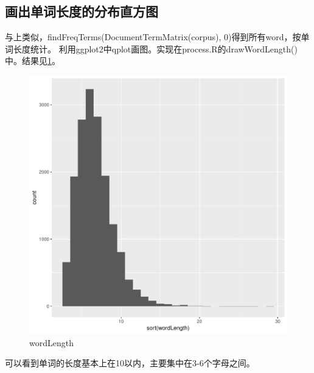 \documentclass[12pt]{article}
\begin{document}
\subsection{画出单词长度的分布直方图}
与上类似，findFreqTerms(DocumentTermMatrix(corpus), 0)得到所有word，按单词长度统计。
利用ggplot2中qplot画图。实现在process.R的drawWordLength()中。结果见\ref{fig:wordLength}。
\begin{figure}[htbp]
\centering
\includegraphics[width=1.0\textwidth]{../result/wordLength.pdf}
\caption{wordLength}
\label{fig:wordLength}
\end{figure}
可以看到单词的长度基本上在10以内，主要集中在3-6个字母之间。
\end{document}
